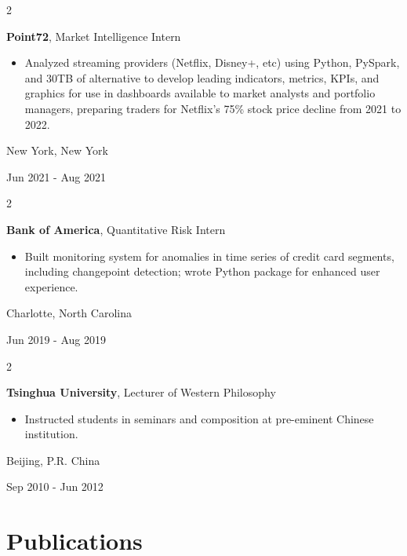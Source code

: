 \documentclass[10pt, letterpaper]{article}
\newenvironment{highlights}{
    \begin{itemize}[
        topsep=0.10 cm,
        parsep=0.10 cm,
        partopsep=0pt,
        itemsep=0pt,
        leftmargin=0.4 cm + 10pt
    ]
}{
    \end{itemize}
} %
\newenvironment{twocolentry}[2][]{
    \onecolentry
    \def\secondColumn{#2}
    \setcolumnwidth{\fill, 4.08 cm}
    \begin{paracol}{2}
}{
    \switchcolumn \raggedleft \secondColumn
    \end{paracol}
    \endonecolentry
} %
\begin{document}
        \begin{twocolentry}{
            New York, New York

        Jun 2021 - Aug 2021

        }
            \textbf{Point72}, Market Intelligence Intern
            \begin{highlights}
                \item Analyzed streaming providers (Netflix, Disney+, etc) using Python, PySpark, and 30TB of alternative to develop leading indicators, metrics, KPIs, and graphics for use in dashboards available to market analysts and portfolio managers, preparing traders for Netflix's 75\% stock price decline from 2021 to 2022.
            \end{highlights}
        \end{twocolentry}

        \vspace{0.2 cm}

        \begin{twocolentry}{
            Charlotte, North Carolina

        Jun 2019 - Aug 2019
        }
            \textbf{Bank of America}, Quantitative Risk Intern
            \begin{highlights}
                \item Built monitoring system for anomalies in time series of credit card segments, including changepoint detection; wrote Python package for enhanced user experience.
            \end{highlights}
        \end{twocolentry}

        \vspace{0.2 cm}

        \begin{twocolentry}{
            Beijing, P.R. China

        Sep 2010 - Jun 2012
        }
            \textbf{Tsinghua University}, Lecturer of Western Philosophy
            \begin{highlights}
                \item Instructed students in seminars and composition at pre-eminent Chinese institution.
            \end{highlights}
        \end{twocolentry}
    \section{Publications}
\end{document}
